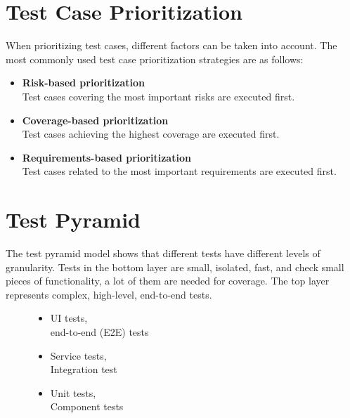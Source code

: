 \documentclass{article}
\begin{document}
\begin{multicols}{3}
{\begin{itemize}
\end{itemize}

\section*{Test Case Prioritization}
When prioritizing test cases, different factors can be taken into account. The most commonly used test case prioritization strategies are as follows:
\begin{itemize}
    \item \textbf{Risk-based prioritization}\\
    Test cases covering the most important risks are executed first.
    
    \item \textbf{Coverage-based prioritization}\\
    Test cases achieving the highest coverage are executed first.
    
    \item \textbf{Requirements-based prioritization}\\
    Test cases related to the most important requirements are executed first.
\end{itemize}

\section*{Test Pyramid}
The test pyramid model shows that different tests have different levels of granularity. Tests in the bottom layer are small, isolated, fast, and check small pieces of functionality, a lot of them are needed for coverage. The top layer represents complex, high-level, end-to-end tests.
\begin{figure}[H]
  \begin{minipage}{0.45\textwidth}
    \centering
    
  \end{minipage}%
  \hspace{0.05\textwidth} %
  \begin{minipage}{0.5\textwidth}
  \raggedright %
\begin{itemize}
\item UI tests,\\ end-to-end (E2E) tests 
\item Service tests,\\ Integration test
\item Unit tests,\\ Component tests
\end{itemize}
  \end{minipage}
\end{figure}

}
\end{multicols}
\end{document}
